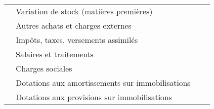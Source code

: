 \begin{table}[h]
\begin{tabular}{|l|p{6cm}|c|c|}
                                                                                              & Variation de stock (matières premières)                               &     &   \\ 
\cline{2-4}                                                                                                                                                  
                                                                                              & Autres achats et charges externes                         &     &   \\ 
\cline{2-4}                                                                                                                                                  
                                                                                              & Impôts, taxes, versements assimilés                                   &     &   \\ 
\cline{2-4}                                                                                                                                                  
                                                                                              & Salaires et traitements                                               &     &   \\ 
\cline{2-4}                                                                                                                                                  
                                                                                              & Charges sociales	                                              &     &   \\ 
\cline{2-4}                                                                                                                                                  
                                                                                              & Dotations aux amortissements sur immobilisations                      &     &   \\ 
\cline{2-4}                                                                                                                                                 
                                                                                              & Dotations aux provisions sur immobilisations                          &     &   \\ 
\cline{2-4}                                                                                                                                                  

\end{tabular}
\end{table}
